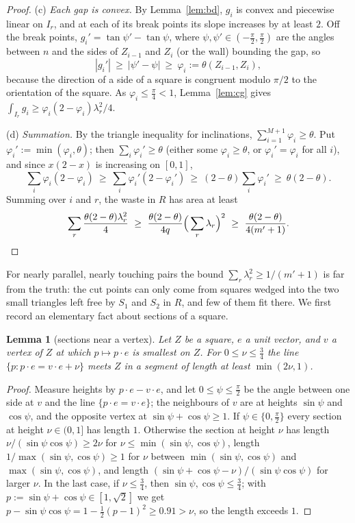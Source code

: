 \documentclass[11pt]{amsart}
\newtheorem{lemma}[theorem]{Lemma}
\theoremstyle{definition}
\theoremstyle{remark}
\begin{document}
\begin{proof}
(c) \emph{Each gap is convex.} By Lemma~\ref{lem:bd}, $g_i$ is convex and piecewise linear on $I_r$, and at each of its break
points its slope increases by at least $2$. Off the break points, $g_i'=\tan\psi'-\tan\psi$, where $\psi,\psi'\in(-\frac\pi2,\frac\pi2)$
are the angles between $n$ and the sides of $Z_{i-1}$ and $Z_i$ (or the wall) bounding the gap, so
\[
|g_i'|\ \ge\ |\psi'-\psi|\ \ge\ \varphi_i:=\theta(Z_{i-1},Z_i),
\]
because the direction of a side of a square is congruent modulo $\pi/2$ to the orientation of the square. As
$\varphi_i\le\frac\pi4<1$, Lemma~\ref{lem:cg} gives $\int_{I_r}g_i\ge\varphi_i(2-\varphi_i)\lambda_r^2/4$.

(d) \emph{Summation.} By the triangle inequality for inclinations, $\sum_{i=1}^{M+1}\varphi_i\ge\theta$. Put
$\varphi_i':=\min(\varphi_i,\theta)$; then $\sum_i\varphi_i'\ge\theta$ (either some $\varphi_i\ge\theta$, or $\varphi_i'=\varphi_i$ for all $i$), and
since $x(2-x)$ is increasing on $[0,1]$,
\[
\sum_i\varphi_i(2-\varphi_i)\ \ge\ \sum_i\varphi_i'(2-\varphi_i')\ \ge\ (2-\theta)\sum_i\varphi_i'\ \ge\ \theta(2-\theta).
\]
Summing over $i$ and $r$, the waste in $R$ has area at least
\[
\sum_r\frac{\theta(2-\theta)\lambda_r^2}{4}\ \ge\ \frac{\theta(2-\theta)}{4q}\Big(\sum_r\lambda_r\Big)^2\ \ge\ \frac{\theta(2-\theta)}{4(m'+1)}.
\qedhere
\]
\end{proof}

For nearly parallel, nearly touching pairs the bound $\sum_r\lambda_r^2\ge1/(m'+1)$ is far from the truth: the cut points can
only come from squares wedged into the two small triangles left free by $S_1$ and $S_2$ in $R$, and few of them fit there.
We first record an elementary fact about sections of a square.

\begin{lemma}[sections near a vertex]\label{lem:cone}
Let $Z$ be a square, $e$ a unit vector, and $v$ a vertex of $Z$ at which $p\mapsto p\cdot e$ is smallest on $Z$. For
$0\le\nu\le\frac34$ the line $\{p:p\cdot e=v\cdot e+\nu\}$ meets $Z$ in a segment of length at least $\min(2\nu,1)$.
\end{lemma}

\begin{proof}
Measure heights by $p\cdot e-v\cdot e$, and let $0\le\psi\le\frac\pi2$ be the angle between one side at $v$ and the line
$\{p\cdot e=v\cdot e\}$; the neighbours of $v$ are at heights $\sin\psi$ and $\cos\psi$, and the opposite vertex at
$\sin\psi+\cos\psi\ge1$. If $\psi\in\{0,\frac\pi2\}$ every section at height $\nu\in(0,1]$ has length $1$. Otherwise the section at
height $\nu$ has length $\nu/(\sin\psi\cos\psi)\ge2\nu$ for $\nu\le\min(\sin\psi,\cos\psi)$, length $1/\max(\sin\psi,\cos\psi)\ge1$ for
$\nu$ between $\min(\sin\psi,\cos\psi)$ and $\max(\sin\psi,\cos\psi)$, and length $(\sin\psi+\cos\psi-\nu)/(\sin\psi\cos\psi)$ for larger $\nu$.
In the last case, if $\nu\le\frac34$, then $\sin\psi,\cos\psi\le\frac34$; with $p:=\sin\psi+\cos\psi\in[1,\sqrt2]$ we get
$p-\sin\psi\cos\psi=1-\frac12(p-1)^2\ge0.91>\nu$, so the length exceeds $1$.
\end{proof}
\end{document}
